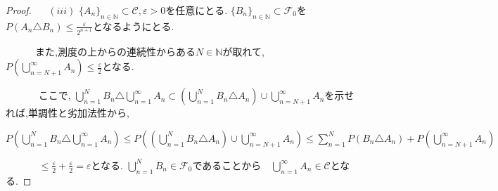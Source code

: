 \documentclass{jsarticle}
\begin{document}
\begin{proof}
$\quad$ $(iii)$ $ \lbrace A_{n} \rbrace_{n \in \mathbb{N}} \subset \mathcal{C},  \varepsilon > 0$を任意にとる. $\lbrace B_{n} \rbrace_{n \in \mathbb{N}} \subset \mathcal{F}_{0}$を$P(A_{n} \triangle B_{n}) \le \frac{\varepsilon}{2^{n+1}} $となるようにとる.\par 
$\quad \qquad$また,測度の上からの連続性からある$N \in \mathbb{N}$が取れて, $P( \displaystyle\bigcup_{n=N+1}^{\infty} A_{n}) \le \frac{\varepsilon}{2}$となる.\par$\quad \qquad$ ここで, $\displaystyle\bigcup_{n=1}^{N} B_{n} \triangle \displaystyle\bigcup_{n=1}^{\infty} A_{n} \subset (\displaystyle\bigcup_{n=1}^{N} B_{n} \triangle A_{n}) \cup \displaystyle\bigcup_{n=N+1}^{\infty} A_{n}$を示せれば,単調性と劣加法性から,\par $\quad \qquad$ $P(\displaystyle\bigcup_{n=1}^{N} B_{n} \triangle \displaystyle\bigcup_{n=1}^{\infty} A_{n}) \le P((\displaystyle\bigcup_{n=1}^{N} B_{n} \triangle A_{n}) \cup \displaystyle\bigcup_{n=N+1}^{\infty} A_{n}) \le  \displaystyle\sum_{n=1}^{N}P(B_{n} \triangle A_{n}) + P(\displaystyle\bigcup_{n=N+1}^{\infty} A_{n})$ \par $\quad \qquad$ $\le \frac{\varepsilon}{2} + \frac{\varepsilon}{2} = \varepsilon $となる. $\displaystyle\bigcup_{n=1}^{N} B_{n} \in \mathcal{F}_{0}$であることから　$\displaystyle\bigcup_{n=1}^{\infty} A_{n} \in \mathcal{C}$となる.


\end{proof}
\end{document}
